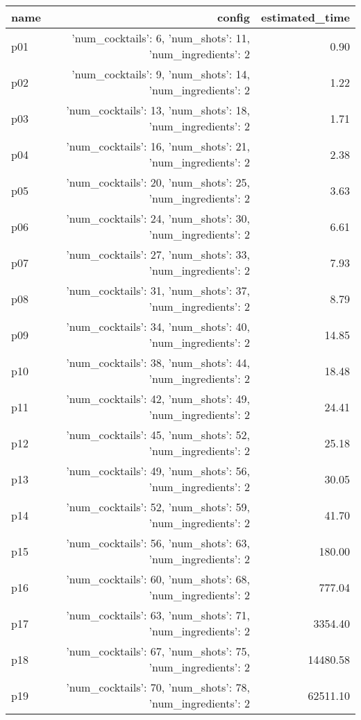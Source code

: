 \documentclass{article}
\begin{document}
                            \begin{center}
                            \scriptsize
                            \begin{tabular}{@{}l|r|r@{}}
                            name & config & estimated\_time\\\midrule
                              p01&{'num\_cocktails': 6, 'num\_shots': 11, 'num\_ingredients': 2}&0.90\\
  p02&{'num\_cocktails': 9, 'num\_shots': 14, 'num\_ingredients': 2}&1.22\\
  p03&{'num\_cocktails': 13, 'num\_shots': 18, 'num\_ingredients': 2}&1.71\\
  p04&{'num\_cocktails': 16, 'num\_shots': 21, 'num\_ingredients': 2}&2.38\\
  p05&{'num\_cocktails': 20, 'num\_shots': 25, 'num\_ingredients': 2}&3.63\\
  p06&{'num\_cocktails': 24, 'num\_shots': 30, 'num\_ingredients': 2}&6.61\\
  p07&{'num\_cocktails': 27, 'num\_shots': 33, 'num\_ingredients': 2}&7.93\\
  p08&{'num\_cocktails': 31, 'num\_shots': 37, 'num\_ingredients': 2}&8.79\\
  p09&{'num\_cocktails': 34, 'num\_shots': 40, 'num\_ingredients': 2}&14.85\\
  p10&{'num\_cocktails': 38, 'num\_shots': 44, 'num\_ingredients': 2}&18.48\\
  p11&{'num\_cocktails': 42, 'num\_shots': 49, 'num\_ingredients': 2}&24.41\\
  p12&{'num\_cocktails': 45, 'num\_shots': 52, 'num\_ingredients': 2}&25.18\\
  p13&{'num\_cocktails': 49, 'num\_shots': 56, 'num\_ingredients': 2}&30.05\\
  p14&{'num\_cocktails': 52, 'num\_shots': 59, 'num\_ingredients': 2}&41.70\\
  p15&{'num\_cocktails': 56, 'num\_shots': 63, 'num\_ingredients': 2}&180.00\\
  p16&{'num\_cocktails': 60, 'num\_shots': 68, 'num\_ingredients': 2}&777.04\\
  p17&{'num\_cocktails': 63, 'num\_shots': 71, 'num\_ingredients': 2}&3354.40\\
  p18&{'num\_cocktails': 67, 'num\_shots': 75, 'num\_ingredients': 2}&14480.58\\
  p19&{'num\_cocktails': 70, 'num\_shots': 78, 'num\_ingredients': 2}&62511.10\\

\end{tabular}
\end{center}
\end{document}
